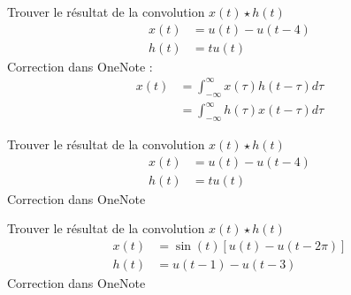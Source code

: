 \documentclass{article}
\theoremstyle{plain}%
\theoremstyle{definition}
\theoremstyle{remark}
\begin{document}
\begin{xca}[]
    Trouver le résultat de la convolution $ x(t) \star h(t) $ \begin{align*}
        x(t) &= u(t) - u(t-4) \\
        h(t) &= tu(t)
    \end{align*}
    Correction dans OneNote : \begin{align*}
        x(t) &= \int_{-\infty }^{\infty } x(\tau )h(t-\tau )d \tau \\
            &= \int_{-\infty }^{\infty } h(\tau )x(t-\tau )d \tau
    \end{align*}
\end{xca}

\begin{xca}[]
    Trouver le résultat de la convolution $ x(t) \star h(t) $ \begin{align*}
        x(t) &= u(t) - u(t-4) \\
        h(t) &= tu(t)
    \end{align*}
    Correction dans OneNote
\end{xca}

\begin{xca}[]
    Trouver le résultat de la convolution $ x(t) \star h(t) $ \begin{align*}
        x(t) &= \sin (t) [u(t) - u(t-2 \pi )] \\
        h(t) &= u(t-1) - u(t-3)
    \end{align*}
    Correction dans OneNote
\end{xca}
\end{document}
